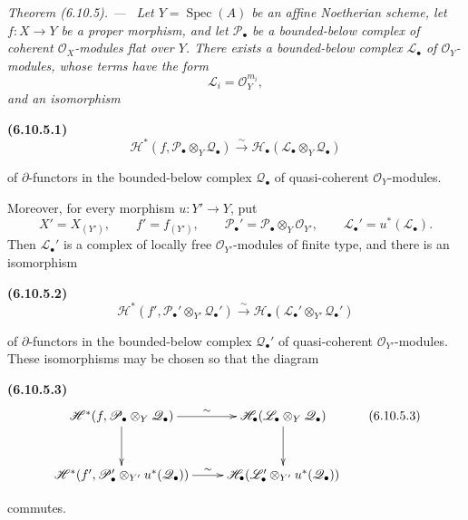 \documentclass[10pt,oneside]{book}
\newcommand{\sh}[1]{\mathscr{#1}}
\newcommand{\Spec}{\operatorname{Spec}}
\newcommand{\oldpage}[2][]{\setcounter{footnote}{0}\marginpar{\scriptsize\textbf{#1}~|~#2}\ignorespaces}
\newenvironment{env}[1][]{\par\medskip\noindent\textbf{(#1)}\ }{\par}
\newenvironment{theorem}[1][]{\par\medskip\noindent\itshape Theorem (#1). ---\ }{\par}
\begin{document}
\begin{theorem}[6.10.5]
\label{III.6.10.5}
Let $Y=\Spec(A)$ be an affine Noetherian scheme, let
$f:X\to Y$ be a proper morphism, and let $\sh P_\bullet$ be a
bounded-below complex of coherent $\sh O_X$-modules flat over
$Y$.  There exists a bounded-below complex $\sh L_\bullet$ of
$\sh O_Y$-modules, whose terms have the form
\[
  \sh L_i=\sh O_Y^{m_i},
\]
and an isomorphism
\begin{env}[6.10.5.1]
\label{III.6.10.5.1}
\[
  \sh H^*
  (f,\sh P_\bullet\otimes_Y\sh Q_\bullet)
  \xrightarrow{\sim}
  \sh H_\bullet
  (\sh L_\bullet\otimes_Y\sh Q_\bullet)
  \tag{6.10.5.1}\label{III.6.10.5.1.eq}
\]
\end{env}
of $\partial$-functors in the bounded-below complex
$\sh Q_\bullet$ of quasi-coherent $\sh O_Y$-modules.

Moreover, for every morphism $u:Y'\to Y$, put
\[
  X'=X_{(Y')},
  \qquad
  f'=f_{(Y')},
  \qquad
  \sh P_\bullet'
  =
  \sh P_\bullet\otimes_Y\sh O_{Y'},
  \qquad
  \sh L_\bullet'=u^*(\sh L_\bullet).
\]
\oldpage[III]{174}
Then $\sh L_\bullet'$ is a complex of locally free
$\sh O_{Y'}$-modules of finite type, and there is an isomorphism
\begin{env}[6.10.5.2]
\label{III.6.10.5.2}
\[
  \sh H^*
  (f',\sh P_\bullet'\otimes_{Y'}\sh Q_\bullet')
  \xrightarrow{\sim}
  \sh H_\bullet
  (\sh L_\bullet'\otimes_{Y'}\sh Q_\bullet')
  \tag{6.10.5.2}\label{III.6.10.5.2.eq}
\]
\end{env}
of $\partial$-functors in the bounded-below complex
$\sh Q_\bullet'$ of quasi-coherent $\sh O_{Y'}$-modules.  These
isomorphisms may be chosen so that the diagram
\begin{env}[6.10.5.3]
\label{III.6.10.5.3}
\[
\xymatrix@C=24pt@R=30pt{
  \sh H^*
  (f,\sh P_\bullet\otimes_Y\sh Q_\bullet)
  \ar[r]^-{\sim}\ar[d]
  &
  \sh H_\bullet
  (\sh L_\bullet\otimes_Y\sh Q_\bullet)
  \ar[d]
  \\
  \sh H^*
  (f',\sh P_\bullet'\otimes_{Y'}u^*(\sh Q_\bullet))
  \ar[r]^-{\sim}
  &
  \sh H_\bullet
  (\sh L_\bullet'\otimes_{Y'}u^*(\sh Q_\bullet))
}
\tag{6.10.5.3}\label{III.6.10.5.3.eq}
\]
\end{env}
commutes.
\end{theorem}
\end{document}
